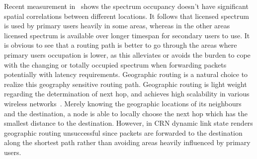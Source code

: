 Recent measurement in~\cite{measurement_Palaios14} shows the spectrum occupancy doesn't have significant spatial correlations between different locations.
It follows that licensed spectrum is used by primary users heavily in some areas, whereas in the other areas licensed spectrum is available over longer timespan for secondary users to use.
It is obvious to see that a routing path is better to go through the areas where primary users occupation is lower, as this alleviates or avoids the burden to cope with the changing or totally occupied spectrum when forwarding packets potentially with latency requirements.
Geographic routing is a natural choice to realize this geography sensitive routing path.
Geographic routing is light weight regarding the determination of next hop, and achieves high scalability in various wireless networks~\cite{geoRouing-qos-2009}. %
Merely knowing the geographic locations of its neighbours and the destination, a node is able to locally choose the next hop which has the smallest distance to the destination.
However, in CRN dynamic link state renders geographic routing unsuccessful since packets are forwarded to the destination along the shortest path rather than avoiding areas heavily influenced by primary users.

